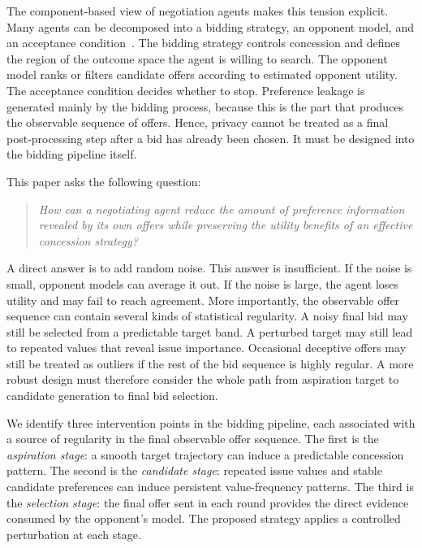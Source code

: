 \documentclass[runningheads]{llncs}
\begin{document}
The component-based view of negotiation agents makes this tension explicit. Many agents can be decomposed into a bidding strategy, an opponent model, and an acceptance condition~\cite{BOA}. The bidding strategy controls concession and defines the region of the outcome space the agent is willing to search. The opponent model ranks or filters candidate offers according to estimated opponent utility. The acceptance condition decides whether to stop. Preference leakage is generated mainly by the bidding process, because this is the part that produces the observable sequence of offers. Hence, privacy cannot be treated as a final post-processing step after a bid has already been chosen. It must be designed into the bidding pipeline itself.

This paper asks the following question:

\begin{quote}
\emph{How can a negotiating agent reduce the amount of preference information revealed by its own offers while preserving the utility benefits of an effective concession strategy?}\\
\end{quote}

A direct answer is to add random noise. This answer is insufficient. If the noise is small, opponent models can average it out. If the noise is large, the agent loses utility and may fail to reach agreement. More importantly, the observable offer sequence can contain several kinds of statistical regularity. A noisy final bid may still be selected from a predictable target band. A perturbed target may still lead to repeated values that reveal issue importance. Occasional deceptive offers may still be treated as outliers if the rest of the bid sequence is highly regular. A more robust design must therefore consider the whole path from aspiration target to candidate generation to final bid selection.

We identify three intervention points in the bidding pipeline, each associated with a source of regularity in the final observable offer sequence. The first is the \emph{aspiration stage}: a smooth target trajectory can induce a predictable concession pattern. The second is the \emph{candidate stage}: repeated issue values and stable candidate preferences can induce persistent value-frequency patterns. The third is the \emph{selection stage}: the final offer sent in each round provides the direct evidence consumed by the opponent's model. The proposed strategy applies a controlled perturbation at each stage.
\end{document}
